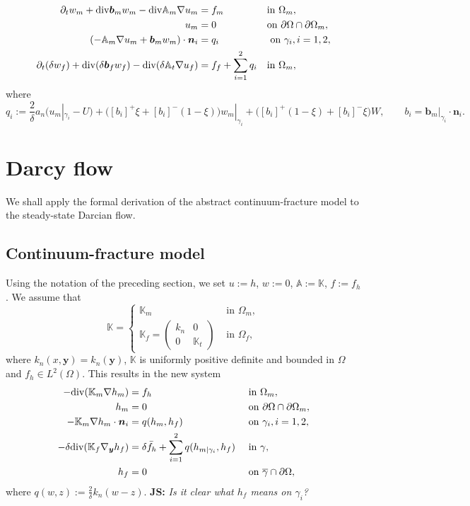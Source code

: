 \documentclass[a4paper]{article}
\def\prtl{\partial}
\def\vc#1{\mathbf{\boldsymbol{#1}}}     %
\def\tn#1{{\mathbb{#1}}}    %
\def\div{{\rm div}}
\def\grad{\nabla}
\def\yy{{\vc y}}
\newcommand{\note}[2]{{\color{blue} \textbf{ #1:} \textit{#2}}}
\begin{document}
\begin{align}
  \label{eq:fr:continuity}
  \prtl_t w_m + \div \vc b_m w_m - \div \tn A_m \grad u_m &= f_m&&  \text{in } \Omega_m,\\
  \label{eq:fr:Dirichlet}
  u_m &= 0&& \text{on } \partial\Omega\cap\partial\Omega_m,\\
  (- \tn A_m\grad u_m + \vc b_m w_m) \cdot \vc n_i &= q_i &&\mbox{ on }\gamma_i,i=1,2,\\ 
  \prtl_t(\delta w_f)  + \div(\delta \vc b_f w_f ) - \div( \delta \tn A_t \grad u_f) 
      &= f_f + \sum_{i=1}^2 q_i&&  \text{in } \Omega_m,\\
\end{align}
where 
\[
    q_i:=\frac2\delta a_n(u_m|_{\gamma_i} - U) 
    +  \big([b_i]^{+}\xi + [b_i]^{-}(1-\xi)\big) w_m|_{\gamma_i}
    +  \big([b_i]^{+}(1-\xi) + [b_i]^{-}\xi\big) W,
    \qquad b_i = \vc b_m |_{\gamma_i} \cdot \vc n_i.
\]



\section{Darcy flow}

We shall apply the formal derivation of the abstract continuum-fracture model to the steady-state Darcian flow.

\subsection{Continuum-fracture model}

Using the notation of the preceding section, we set $u:=h$, $w:=0$, $\tn A:=\tn K$, $f:=f_h$.
We assume that
\[ \tn K = \begin{cases}\tn K_m & \mbox{ in }\Omega_m,\\ \tn K_f = \begin{pmatrix}k_n & 0\\0&\tn K_t\end{pmatrix} & \mbox{ in }\Omega_f,\end{cases} \]
where $k_n(x,\yy)=k_n(\yy)$, $\tn K$ is uniformly positive definite and bounded in $\Omega$ and $f_h\in L^2(\Omega)$.
This results in the new system
\begin{subequations}
\label{eq:asymptotic_darcy}
\begin{align}
-\div(\tn K_m\nabla h_m) &= f_h &&\mbox{ in }\Omega_m,\\
h_m &= 0 &&\mbox{ on }\partial\Omega\cap\partial\Omega_m,\\
-\tn K_m\nabla h_m\cdot\vc n_i &= q(h_m,h_f) &&\mbox{ on }\gamma_i,i=1,2,\\
-\delta\div(\tn K_f\nabla_\yy h_f) &= \delta\bar f_h + \sum_{i=1}^2 q(h_{m|\gamma_i},h_f) &&\mbox{ in }\gamma,\\
h_f &= 0 &&\mbox{ on }\overline\gamma\cap\partial\Omega,
\end{align}
\end{subequations}
where $q(w,z):=\frac2\delta k_n(w-z)$.
\note{JS}{Is it clear what $h_f$ means on $\gamma_i$?}
\end{document}
